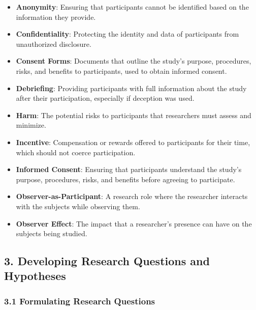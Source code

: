 \documentclass[
]{book}
\providecommand{\tightlist}{%
  \setlength{\itemsep}{0pt}\setlength{\parskip}{0pt}}
\begin{document}
\begin{itemize}
\tightlist
\item
  \textbf{Anonymity}: Ensuring that participants cannot be identified based on the information they provide.
\item
  \textbf{Confidentiality}: Protecting the identity and data of participants from unauthorized disclosure.
\item
  \textbf{Consent Forms}: Documents that outline the study's purpose, procedures, risks, and benefits to participants, used to obtain informed consent.
\item
  \textbf{Debriefing}: Providing participants with full information about the study after their participation, especially if deception was used.
\item
  \textbf{Harm}: The potential risks to participants that researchers must assess and minimize.
\item
  \textbf{Incentive}: Compensation or rewards offered to participants for their time, which should not coerce participation.
\item
  \textbf{Informed Consent}: Ensuring that participants understand the study's purpose, procedures, risks, and benefits before agreeing to participate.
\item
  \textbf{Observer-as-Participant}: A research role where the researcher interacts with the subjects while observing them.
\item
  \textbf{Observer Effect}: The impact that a researcher's presence can have on the subjects being studied.
\end{itemize}

\subsection*{\texorpdfstring{3. \textbf{Developing Research Questions and Hypotheses}}{3. Developing Research Questions and Hypotheses}}\label{developing-research-questions-and-hypotheses-1}

\subsubsection*{\texorpdfstring{\textbf{3.1 Formulating Research Questions}}{3.1 Formulating Research Questions}}\label{formulating-research-questions-1}
\end{document}
